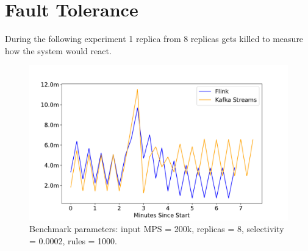 \section{Fault Tolerance}\label{sec:fault-tolerance}
During the following experiment 1 replica from 8 replicas gets killed to measure how the
system would react.

\begin{figure}[H]
    \centering
    \includegraphics[width=1\textwidth]{figures/kafka-streams-flink-fault-tolerance}
    \caption{Benchmark parameters: input MPS = 200k, replicas = 8, selectivity = 0.0002, rules = 1000.}
    \label{fig:kafka-streams-flink-fault-tolerance}
\end{figure}

